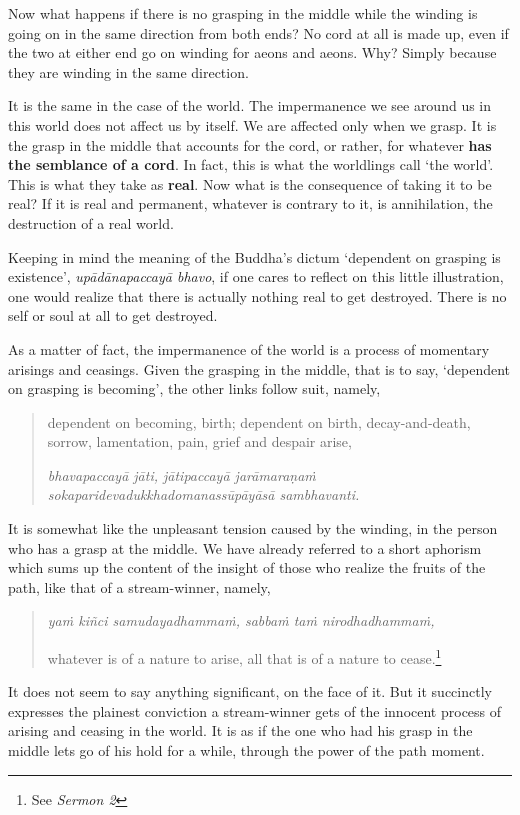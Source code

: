 Now what happens if there is no grasping in the middle while the winding is going on in the same direction from both ends? No cord at all is made up, even if the two at either end go on winding for aeons and aeons. Why? Simply because they are winding in the same direction.

It is the same in the case of the world. The impermanence we see around us in this world does not affect us by itself. We are affected only when we grasp. It is the grasp in the middle that accounts for the cord, or rather, for whatever \textbf{has the semblance of a cord}. In fact, this is what the worldlings call `the world'. This is what they take as \textbf{real}. Now what is the consequence of taking it to be real? If it is real and permanent, whatever is contrary to it, is annihilation, the destruction of a real world.

Keeping in mind the meaning of the Buddha's dictum `dependent on grasping is existence', \emph{upādānapaccayā bhavo}, if one cares to reflect on this little illustration, one would realize that there is actually nothing real to get destroyed. There is no self or soul at all to get destroyed.

As a matter of fact, the impermanence of the world is a process of momentary arisings and ceasings. Given the grasping in the middle, that is to say, `dependent on grasping is becoming', the other links follow suit, namely,

\begin{quote}
dependent on becoming, birth; dependent on birth, decay-and-death, sorrow, lamentation, pain, grief and despair arise,

\emph{bhavapaccayā jāti, jātipaccayā jarāmaraṇaṁ sokaparidevadukkhadomanassūpāyāsā sambhavanti.}
\end{quote}

It is somewhat like the unpleasant tension caused by the winding, in the person who has a grasp at the middle. We have already referred to a short aphorism which sums up the content of the insight of those who realize the fruits of the path, like that of a stream-winner, namely,

\begin{quote}
\emph{yaṁ kiñci samudayadhammaṁ, sabbaṁ taṁ nirodhadhammaṁ,}

whatever is of a nature to arise, all that is of a nature to cease.\footnote{See \emph{Sermon 2}}
\end{quote}

It does not seem to say anything significant, on the face of it. But it succinctly expresses the plainest conviction a stream-winner gets of the innocent process of arising and ceasing in the world. It is as if the one who had his grasp in the middle lets go of his hold for a while, through the power of the path moment.

